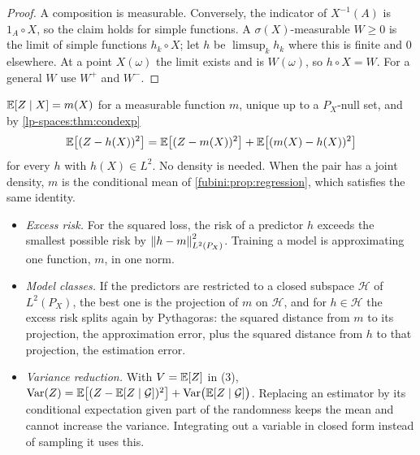 \begin{notechapter}
\begin{proof}
A composition is measurable. Conversely, the indicator of $X^{-1}(A)$ is
$1_A\circ X$, so the claim holds for simple functions. A
$\sigma(X)$-measurable $W\geq0$ is the limit of simple functions
$h_k\circ X$; let $h$ be $\limsup_kh_k$ where this is finite and $0$
elsewhere. At a point $X(\omega)$ the limit exists and is $W(\omega)$,
so $h\circ X = W$. For a general $W$ use $W^+$ and $W^-$.
\end{proof}

\begin{keyidea}
$\mathbb{E}[Z\mid X] = m(X)$ for a measurable function $m$, unique up to a
$P_X$-null set, and by \cref{lp-spaces:thm:condexp}
\[
  \mathbb{E}\bigl[(Z - h(X))^2\bigr]
  = \mathbb{E}\bigl[(Z - m(X))^2\bigr] + \mathbb{E}\bigl[(m(X) - h(X))^2\bigr]
\]
for every $h$ with $h(X)\in L^2$. No density is needed. When the pair
has a joint density, $m$ is the conditional mean of
\cref{fubini:prop:regression}, which satisfies the same identity.
\end{keyidea}

\begin{mlthread}
\begin{itemize}[nosep]
  \item \emph{Excess risk.} For the squared loss, the risk of a
        predictor $h$ exceeds the smallest possible risk by
        $\left\|h - m\right\|^2_{L^2(P_X)}$. Training a model is approximating
        one function, $m$, in one norm.
  \item \emph{Model classes.} If the predictors are restricted to a
        closed subspace $\mathcal H$ of $L^2(P_X)$, the best one is the
        projection of $m$ on $\mathcal H$, and for $h\in\mathcal H$ the
        excess risk splits again by Pythagoras: the squared distance
        from $m$ to its projection, the approximation error, plus the
        squared distance from $h$ to that projection, the estimation
        error.
  \item \emph{Variance reduction.} With $V = \mathbb{E}[Z]$ in (3),
        $\operatorname{Var}(Z) = \mathbb{E}\bigl[(Z - \mathbb{E}[Z\mid\mathcal G])^2\bigr]
        + \operatorname{Var}\bigl(\mathbb{E}[Z\mid\mathcal G]\bigr)$. Replacing an estimator
        by its conditional expectation given part of the randomness
        keeps the mean and cannot increase the variance. Integrating
        out a variable in closed form instead of sampling it uses this.
\end{itemize}
\end{mlthread}


\end{notechapter}
